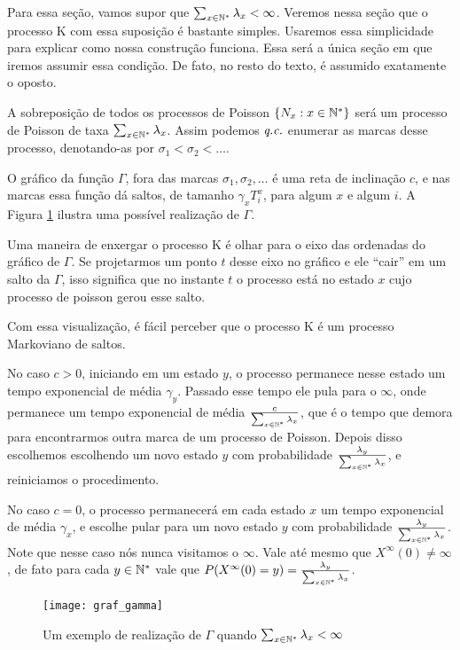 Para essa seção, vamos supor que $\sum_{x \in {\mathbb{N^*}}} \lambda_x <
\infty$. Veremos nessa seção que o processo K com essa suposição é
bastante simples. Usaremos essa simplicidade para explicar como nossa
construção funciona. Essa será a única seção em que iremos assumir
essa condição. De fato, no resto do texto, é assumido exatamente o
oposto.

A sobreposição de todos os processos de Poisson $\{N_x : x \in {\mathbb{N^*}}\}$
será um processo de Poisson de taxa $\sum_{x \in {\mathbb{N^*}}}
\lambda_x$. Assim podemos ${\emph{q.c.}}$ enumerar as marcas desse processo,
denotando-as por $ \sigma_1 < \sigma_2 < \ldots$.

O gráfico da função $\Gamma$, fora das marcas $\sigma_1, \sigma_2,
\ldots$ é uma reta de inclinação $c$, e nas marcas essa função dá
saltos, de tamanho $\gamma_x T^x_i$, para algum $x$ e algum $i$. A
Figura \ref{fig:graf_gamma} ilustra uma possível realização de
$\Gamma$.

Uma maneira de enxergar o processo K é olhar para o eixo das ordenadas
do gráfico de $\Gamma$. Se projetarmos um ponto $t$ desse eixo no
gráfico e ele ``cair'' em um salto da $\Gamma$, isso significa que no
instante $t$ o processo está no estado $x$ cujo processo de poisson
gerou esse salto.

Com essa visualização, é fácil perceber que o processo K é um processo
Markoviano de saltos.

No caso $c > 0$, iniciando em um estado $y$, o processo permanece
nesse estado um tempo exponencial de média $\gamma_y$. Passado esse
tempo ele pula para o $\infty$, onde permanece um tempo exponencial de
média $\frac{c}{\sum_{x \in {\mathbb{N^*}}} \lambda_x}$, que é o tempo que demora
para encontrarmos outra marca de um processo de Poisson. Depois disso
escolhemos escolhendo um novo estado $y$ com probabilidade
$\frac{\lambda_y}{\sum_{x \in {\mathbb{N^*}}} \lambda_x}$, e reiniciamos o procedimento.

No caso $c=0$, o processo permanecerá em cada estado $x$ um tempo
exponencial de média $\gamma_x$, e escolhe pular para um novo estado
$y$ com probabilidade $\frac{\lambda_y}{\sum_{x \in {\mathbb{N^*}}} \lambda_x}$.
Note que nesse caso nós nunca visitamos o $\infty$. Vale até mesmo que
$X^\infty(0) \neq \infty$ \qc, de fato para cada $y \in {\mathbb{N^*}}$ vale que 
$P(X^\infty(0) = y) = \frac{\lambda_y}{\sum_{x \in {\mathbb{N^*}}} \lambda_x}$.

\begin{figure}
  \centering
  \texttt{[image: graf\_gamma]}
  \caption{Um exemplo de realização de $\Gamma$ quando $\sum_{x \in
      {\mathbb{N^*}}} \lambda_x < \infty$}
  \label{fig:graf_gamma}
\end{figure}

